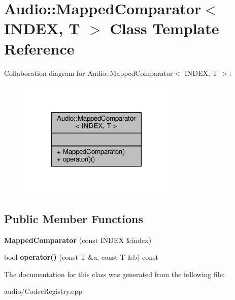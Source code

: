 \hypertarget{classAudio_1_1MappedComparator}{}\section{Audio\+:\+:Mapped\+Comparator$<$ I\+N\+D\+EX, T $>$ Class Template Reference}
\label{classAudio_1_1MappedComparator}


Collaboration diagram for Audio\+:\+:Mapped\+Comparator$<$ I\+N\+D\+EX, T $>$\+:
\nopagebreak
\begin{figure}[H]
\begin{center}
\leavevmode
\includegraphics[width=213pt]{de/d65/classAudio_1_1MappedComparator__coll__graph}
\end{center}
\end{figure}
\subsection*{Public Member Functions}
\begin{DoxyCompactItemize}
\item 
{\bfseries Mapped\+Comparator} (const I\+N\+D\+EX \&index)\hypertarget{classAudio_1_1MappedComparator_a696a3940311c7c40beac5e96492ff10e}{}\label{classAudio_1_1MappedComparator_a696a3940311c7c40beac5e96492ff10e}

\item 
bool {\bfseries operator()} (const T \&a, const T \&b) const \hypertarget{classAudio_1_1MappedComparator_a27ff8f3e358e64ac414a6d17e66555dc}{}\label{classAudio_1_1MappedComparator_a27ff8f3e358e64ac414a6d17e66555dc}

\end{DoxyCompactItemize}


The documentation for this class was generated from the following file\+:\begin{DoxyCompactItemize}
\item 
audio/Codec\+Registry.\+cpp\end{DoxyCompactItemize}
